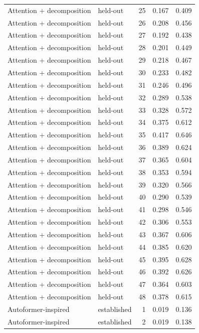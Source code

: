 \begin{tabular}{llrrr}
Attention + decomposition & held-out & 25 & 0.167 & 0.409 \\
Attention + decomposition & held-out & 26 & 0.208 & 0.456 \\
Attention + decomposition & held-out & 27 & 0.192 & 0.438 \\
Attention + decomposition & held-out & 28 & 0.201 & 0.449 \\
Attention + decomposition & held-out & 29 & 0.218 & 0.467 \\
Attention + decomposition & held-out & 30 & 0.233 & 0.482 \\
Attention + decomposition & held-out & 31 & 0.246 & 0.496 \\
Attention + decomposition & held-out & 32 & 0.289 & 0.538 \\
Attention + decomposition & held-out & 33 & 0.328 & 0.572 \\
Attention + decomposition & held-out & 34 & 0.375 & 0.612 \\
Attention + decomposition & held-out & 35 & 0.417 & 0.646 \\
Attention + decomposition & held-out & 36 & 0.389 & 0.624 \\
Attention + decomposition & held-out & 37 & 0.365 & 0.604 \\
Attention + decomposition & held-out & 38 & 0.353 & 0.594 \\
Attention + decomposition & held-out & 39 & 0.320 & 0.566 \\
Attention + decomposition & held-out & 40 & 0.290 & 0.539 \\
Attention + decomposition & held-out & 41 & 0.298 & 0.546 \\
Attention + decomposition & held-out & 42 & 0.306 & 0.553 \\
Attention + decomposition & held-out & 43 & 0.367 & 0.606 \\
Attention + decomposition & held-out & 44 & 0.385 & 0.620 \\
Attention + decomposition & held-out & 45 & 0.395 & 0.628 \\
Attention + decomposition & held-out & 46 & 0.392 & 0.626 \\
Attention + decomposition & held-out & 47 & 0.364 & 0.603 \\
Attention + decomposition & held-out & 48 & 0.378 & 0.615 \\
Autoformer-inspired & established & 1 & 0.019 & 0.136 \\
Autoformer-inspired & established & 2 & 0.019 & 0.138 \\

\end{tabular}
